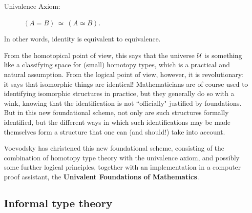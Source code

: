 {\begin{description}
\item[Univalence Axiom:]  $(A = B)\ \simeq\ (A\simeq B)$.
\end{description}
%
In other words, identity is equivalent to equivalence. 

From the homotopical point of view, this says that the universe ${\mathcal U}$ is something like a classifying space for (small) homotopy types, which is a practical and natural assumption.  From the  logical point of view, however, it is revolutionary: it says that isomorphic things are identical!  Mathematicians are of course used to identifying isomorphic structures in practice, but they generally do so with a wink, knowing that the identification is not ``officially" justified by foundations.  But in this new foundational scheme, not only are such structures formally identified, but the different ways in which such identifications may be made themselves form a structure that one can (and should!) take into account.

Voevodsky has christened this new foundational scheme, consisting of the combination of homotopy type theory with the univalence axiom, and possibly some further logical principles, together with an implementation in a computer proof assistant, the {\bf Univalent Foundations of Mathematics}.

\subsection*{Informal type theory}

}
